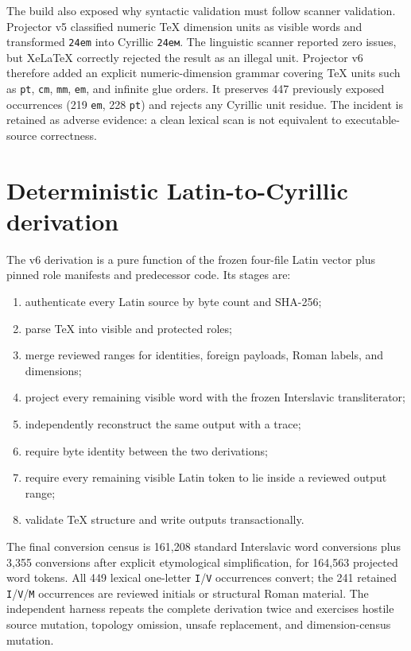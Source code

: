 \documentclass[11pt]{article}
\newcommand{\code}[1]{\texttt{#1}}
\begin{document}
The build also exposed why syntactic validation must follow scanner validation. Projector v5 classified numeric TeX dimension units as visible words and transformed \code{24em} into Cyrillic \code{24ем}. The linguistic scanner reported zero issues, but XeLaTeX correctly rejected the result as an illegal unit. Projector v6 therefore added an explicit numeric-dimension grammar covering TeX units such as \code{pt}, \code{cm}, \code{mm}, \code{em}, and infinite glue orders. It preserves 447 previously exposed occurrences (219 \code{em}, 228 \code{pt}) and rejects any Cyrillic unit residue. The incident is retained as adverse evidence: a clean lexical scan is not equivalent to executable-source correctness.

\section{Deterministic Latin-to-Cyrillic derivation}

The v6 derivation is a pure function of the frozen four-file Latin vector plus pinned role manifests and predecessor code. Its stages are:

\begin{enumerate}
\item authenticate every Latin source by byte count and SHA-256;
\item parse TeX into visible and protected roles;
\item merge reviewed ranges for identities, foreign payloads, Roman labels, and dimensions;
\item project every remaining visible word with the frozen Interslavic transliterator;
\item independently reconstruct the same output with a trace;
\item require byte identity between the two derivations;
\item require every remaining visible Latin token to lie inside a reviewed output range;
\item validate TeX structure and write outputs transactionally.
\end{enumerate}

The final conversion census is 161,208 standard Interslavic word conversions plus 3,355 conversions after explicit etymological simplification, for 164,563 projected word tokens. All 449 lexical one-letter \code{I}/\code{V} occurrences convert; the 241 retained \code{I}/\code{V}/\code{M} occurrences are reviewed initials or structural Roman material. The independent harness repeats the complete derivation twice and exercises hostile source mutation, topology omission, unsafe replacement, and dimension-census mutation.
\end{document}
